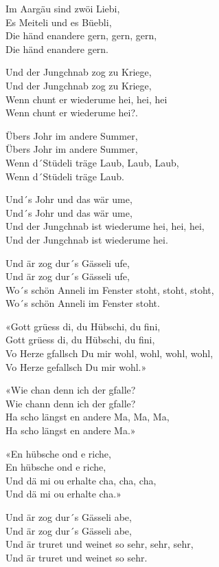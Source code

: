 \documentclass[
  letterpaper,
]{scrbook}
\begin{document}
Im Aargäu sind zwöi Liebi,\\
Es Meiteli und es Büebli,\\
Die händ enandere gern, gern, gern,\\
Die händ enandere gern.

Und der Jungchnab zog zu Kriege,\\
Und der Jungchnab zog zu Kriege,\\
Wenn chunt er wiederume hei, hei, hei\\
Wenn chunt er wiederume hei?.

Übers Johr im andere Summer,\\
Übers Johr im andere Summer,\\
Wenn d´Stüdeli träge Laub, Laub, Laub,\\
Wenn d´Stüdeli träge Laub.

Und´s Johr und das wär ume,\\
Und´s Johr und das wär ume,\\
Und der Jungchnab ist wiederume hei, hei, hei,\\
Und der Jungchnab ist wiederume hei.

Und är zog dur´s Gässeli ufe,\\
Und är zog dur´s Gässeli ufe,\\
Wo´s schön Anneli im Fenster stoht, stoht, stoht,\\
Wo´s schön Anneli im Fenster stoht.

«Gott grüess di, du Hübschi, du fini,\\
Gott grüess di, du Hübschi, du fini,\\
Vo Herze gfallsch Du mir wohl, wohl, wohl, wohl,\\
Vo Herze gefallsch Du mir wohl.»

«Wie chan denn ich der gfalle?\\
Wie chann denn ich der gfalle?\\
Ha scho längst en andere Ma, Ma, Ma,\\
Ha scho längst en andere Ma.»

«En hübsche ond e riche,\\
En hübsche ond e riche,\\
Und dä mi ou erhalte cha, cha, cha,\\
Und dä mi ou erhalte cha.»

Und är zog dur´s Gässeli abe,\\
Und är zog dur´s Gässeli abe,\\
Und är truret und weinet so sehr, sehr, sehr,\\
Und är truret und weinet so sehr.
\end{document}
